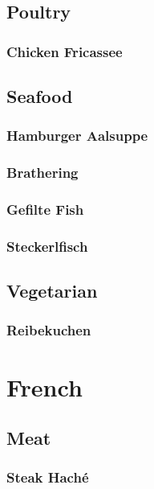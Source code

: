 \documentclass[a4paper, oneside]{book}
\begin{document}
\section{Poultry}

\subsection{Chicken Fricassee}

\section{Seafood}

\subsection{Hamburger Aalsuppe}

\subsection{Brathering}

\subsection{Gefilte Fish}

\subsection{Steckerlfisch}

\section{Vegetarian}

\subsection{Reibekuchen}

\chapter{French}

\section{Meat}

\subsection{Steak Haché}
\end{document}
